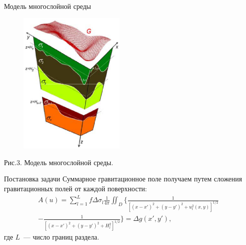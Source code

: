 \documentclass[10pt,pdf, mathserif, hyperref={unicode}]{beamer}
\begin{document}
\begin{frame}{Модель многослойной среды}
	\begin{figure}[h]
		\centering
		\includegraphics[height=7.0cm]{MultilayerModel}
		\label{fig:multlayer}
	\end{figure}
	\centering
	Рис.3. Модель многослойной среды.
\end{frame}
\begin{frame}{Постановка задачи}
	Суммарное гравитационное поле получаем путем сложения гравитационных полей от каждой поверхности:
	\begin{equation*}
	\begin{aligned}
	A(u)=\sum_{l=1}^{L}f\Delta\sigma_l\frac{1}{4\pi}\iint_D\bigg\{\frac{1}{[(x-x')^2+(y-y')^2+u_l^2(x,y)]^{1/2}} \\
	-\frac{1}{[(x-x')^2+(y-y')^2+H_l^2]^{1/2}}\bigg\}=\Delta g(x',y'),
	\end{aligned}
	\end{equation*}
	где $L$~--- число границ раздела.
\end{frame}
\end{document}
